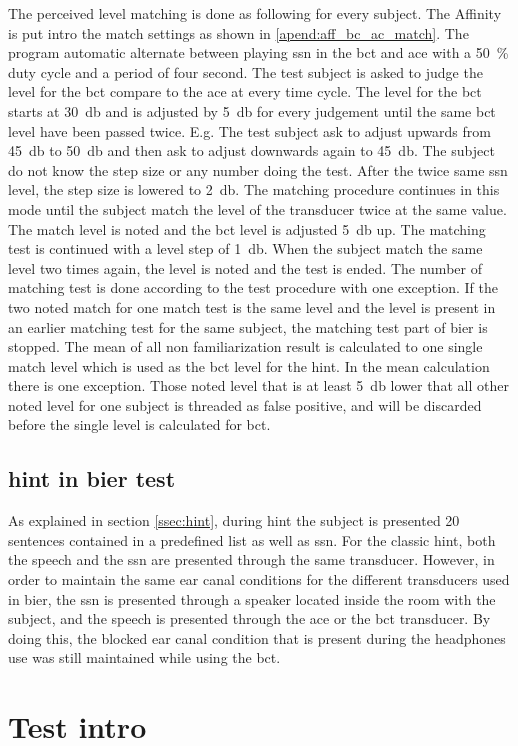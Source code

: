 The perceived level matching is done as following for every subject. The Affinity is put intro the match settings as shown in \autoref{apend:aff_bc_ac_match}. The program automatic alternate between playing \gls{ssn} in the \gls{bct} and \gls{ace} with a \SI{50}{\percent} duty cycle and a period of four second. The test subject is asked to judge the level for the \gls{bct} compare to the \gls{ace} at every time cycle. The level for the \gls{bct} starts at \SI{30}{\decibel} and is adjusted by \SI{5}{\decibel} for every judgement until the same \gls{bct} level have been passed twice. E.g. The test subject ask to adjust upwards from \SI{45}{\decibel} to \SI{50}{\decibel} and then ask to adjust downwards again to \SI{45}{\decibel}. The subject do not know the step size or any number doing the test. After the twice same \gls{ssn} level, the step size is lowered to \SI{2}{\decibel}. The matching procedure continues in this mode until the subject match the level of the transducer twice at the same value. The match level is noted and the  \gls{bct} level is adjusted \SI{5}{\decibel} up. The matching test is continued with a level step of \SI{1}{\decibel}. When the subject match the same level two times again, the level is noted and the test is ended. The number of matching test is done according to the test procedure with one exception. If the two noted match for one match test is the same level and the level is present in an earlier matching test for the same subject, the matching test part of \gls{bier} is stopped. The mean of all non familiarization result is calculated to one single match level which is used as the \gls{bct} level for the \gls{hint}. In the mean calculation there is one exception. Those noted level that is at least \SI{5}{\decibel} lower that all other noted level for one subject is threaded as false positive, and will be discarded before the single level is calculated for \gls{bct}.





\subsection{\gls{hint} in \gls{bier} test}
As explained in section \autoref{ssec:hint}, during \gls{hint} the subject is presented 20 sentences contained in a predefined list as well as \gls{ssn}. For the classic \gls{hint}, both the speech and the \gls{ssn} are presented through the same transducer. However, in order to maintain the same ear canal conditions for the different transducers used in \gls{bier}, the \gls{ssn} is presented through a speaker located inside the room with the subject, and the speech is presented through the  \gls{ace} or the \gls{bct} transducer. By doing this, the blocked ear canal condition that is present during the headphones use was still maintained while using the \gls{bct}.



\section{Test intro}



